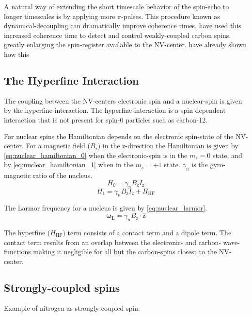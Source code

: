 A natural way of extending the short timescale behavior of the spin-echo to longer timescales is by applying more $\pi$-pulses. This procedure known as dynamical-decoupling can dramatically improve coherence times\citep{Lange2010Universal}.
 have used this increased coherence time to detect and control weakly-coupled carbon spins, greatly enlarging the spin-register available to the NV-center.
\citet{Taminiau2014Universal} have already shown how this


\subsection{The Hyperfine Interaction}
The coupling between the NV-centers electronic spin and a nuclear-spin is given by the hyperfine-interaction. The hyperfine-interaction is a spin dependent interaction that is not present for spin-0 particles such as carbon-12.

For nuclear spins the Hamiltonian depends on the electronic spin-state of the NV-center.
For a magnetic field ($B_\mathrm{z}$) in the z-direction the Hamiltonian is given by \cref{eq:nuclear_hamiltonian_0} when the electronic-spin is in the $m_s = 0$ state, and by \cref{eq:nuclear_hamiltonian_1} when in the $m_s = +1$ state\citep{Taminiau2014Universal}. $\gamma_n$ is the gyro-magnetic ratio of the nucleus.
 \begin{equation}
 \label{eq:nuclear_hamiltonian_0}
H_0= \gamma_{n} B_\mathrm{z} I_\mathrm{z}
\end{equation}
\begin{equation}
 \label{eq:nuclear_hamiltonian_1}
    H_1 = \gamma_{n} B_\mathrm{z} I_\mathrm{z} +H_{\mathrm{HF}}
\end{equation}

The Larmor frequency for a nucleus is given by  \cref{eq:nuclear_larmor}.
\begin{equation}
\label{eq:nuclear_larmor}
\bm{\omega_L} = \gamma_{n}B_\mathrm{z} \cdot\bm{\hat{\mathrm{z}}}
\end{equation}

The hyperfine ($H_{\mathrm{HF}}$) term consists of a contact term and a dipole term.
The contact term results from an overlap between the electronic- and carbon- wave-functions making it negligible for all but the carbon-spins closest to the NV-center.


\subsection{Strongly-coupled spins}
Example of nitrogen as strongly coupled spin.


